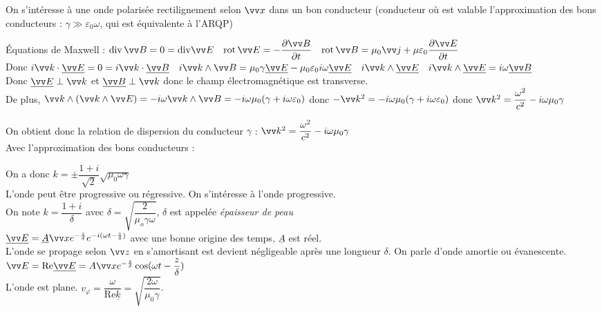 ﻿\documentclass[a4paper]{article}
\begin{document}
\pagestyle{fancy}
\fancyhf{}
\setlength{\headheight}{15pt}

\begin{center}
	\large{}
\end{center}


On s'intéresse à une onde polarisée rectilignement selon $\vv x$ dans un bon conducteur (conducteur où est valable l'approximation des bons conducteurs : $\gamma\gg\varepsilon_0\omega$, qui est équivalente à l'ARQP)\par
Équations de Maxwell : $\mathrm{div}\,\vv B=0=\mathrm{div}\vv E\quad\mathrm{rot}\,\vv E=-\dfrac{\partial\vv B}{\partial t}\quad\mathrm{rot}\,\vv B=\mu_0\vv j + \mu \varepsilon_0 \dfrac{\partial\vv E}{\partial t}$\\
Donc $i\vv k\cdot \underline{\vv E}=0=i\vv k\cdot \underline{\vv B}\quad i\vv k\wedge\vv B=\mu_0\gamma\underline{\vv E}-\mu_0\varepsilon_0 i\omega \underline{\vv E}\quad i\vv k\wedge \underline{\vv E}\quad i\vv k\wedge \underline{\vv E}=i\omega \underline{\vv B}$\\
Donc $\underline{\vv E}\perp\vv k$ et $\underline{\vv B}\perp\vv k$ donc le champ électromagnétique est transverse.\\
De plus, \( \vv k\wedge (\vv k\wedge\vv E) = -i\omega\vv k\wedge\vv B = - i\omega\mu_0 (\gamma + i\omega\varepsilon_0) \) donc \( -\vv k^2 = - i\omega\mu_0(\gamma + i\omega\varepsilon_0) \) donc \( \vv k^2 = \dfrac{\omega^2}{c^2} - i\omega\mu_0\gamma  \)
\par

On obtient donc la relation de dispersion du conducteur $\gamma$ : $\vv k^2=\dfrac{\omega^2}{c^2}-i\omega\mu_0\gamma$\\
Avec l'approximation des bons conducteurs : 
\par

On a donc $k=\pm \dfrac{1+i}{\sqrt{2}}\sqrt{\mu_0\omega\gamma}$\\
L'onde peut être progressive ou régressive. On s'intéresse à l'onde progressive.\\
On note $k=\dfrac{1+i}{\delta}$ avec $\delta=\sqrt{\dfrac{2}{\mu_o\gamma\omega}}$, \(\delta\) est appelée \emph{épaisseur de peau}\\
$\underline{\vv E}=\underline{A}\vv xe^{-\frac{z}{\delta}}e^{-i(\omega t- \frac{z}{\delta})}$ avec une bonne origine des temps, $\underline{A}$ est réel.\\
L'onde se propage selon $\vv z$ en s'amortisant est devient négligeable après une longueur \(\delta\). On parle d'onde amortie ou évanescente.\\
$\vv E=\text{Re} \underline{\vv E}=A\vv xe^{-\frac{z}{\delta}}\cos(\omega t- \dfrac{z}{\delta})$\\
L'onde est plane. $v_\varphi=\dfrac{\omega}{\text{Re} \underline{k}}=\sqrt{\dfrac{2\omega}{\mu_0\gamma}}$.\par
\end{document}
